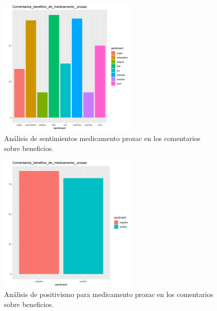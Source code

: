 \documentclass[spanish,]{article}
\begin{document}
\begin{figure}[h]
    \centering
    \includegraphics[width=0.6\textwidth]{figuras/sentimientos/Aprozac1.png}
    \caption{Análisis de sentimientos medicamento prozac en los comentarios sobre beneficios.}
    \label{fig:sentimientos:36}
\end{figure}

\begin{figure}[h]
    \centering
    \includegraphics[width=0.6\textwidth]{figuras/sentimientos/Aprozac2.png}
    \caption{Análisis de positivismo para medicamento prozac en los comentarios sobre beneficios.}
    \label{fig:sentimientos:37}
\end{figure}
\end{document}
